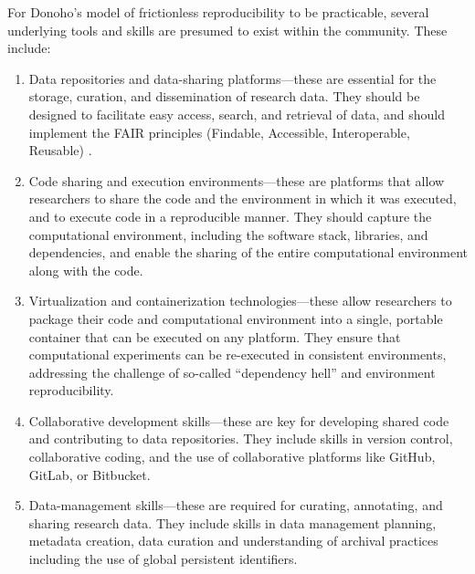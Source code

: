\documentclass[]{hdsr}
\begin{document}
For Donoho's model of frictionless reproducibility to be practicable, several underlying tools and skills are presumed to exist within the community. These include:

\begin{enumerate}
    \item Data repositories and data-sharing platforms---these are essential for the storage, curation, and dissemination of research data. They should be designed to facilitate easy access, search, and retrieval of data, and should implement the FAIR principles (Findable, Accessible, Interoperable, Reusable) \citep{wilkinson2016fair}.
    \item Code sharing and execution environments---these are platforms that allow researchers to share the code and the environment in which it was executed, and to execute code in a reproducible manner. They should capture the computational environment, including the software stack, libraries, and dependencies, and enable the sharing of the entire computational environment along with the code.
    \item Virtualization and containerization technologies---these allow researchers to package their code and computational environment into a single, portable container that can be executed on any platform. They ensure that computational experiments can be re-executed in consistent environments, addressing the challenge of so-called ``dependency hell'' and environment reproducibility.
    \item Collaborative development skills---these are key for developing shared code and contributing to data repositories. They include skills in version control, collaborative coding, and the use of collaborative platforms like GitHub, GitLab, or Bitbucket.
    \item Data-management skills---these are required for curating, annotating, and sharing research data. They include skills in data management planning, metadata creation, data curation and understanding of archival practices including the use of global persistent identifiers.
\end{enumerate}
\end{document}
